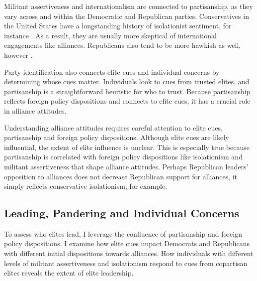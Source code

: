 \documentclass[12pt]{article}
\begin{document}
Militant assertiveness and internationalism are connected to partisanship, as they vary across and within the Democratic and Republican parties. 
Conservatives in the United States have a longstanding history of isolationist sentiment, for instance \citep{Kupchan2020}.
As a result, they are usually more skeptical of international engagements like alliances. 
Republicans also tend to be more hawkish as well, however \citep{Gries2014}. 


Party identification also connects elite cues and individual concerns by determining whose cues matter.
Individuals look to cues from trusted elites, and partisanship is a straightforward heuristic for who to trust. 
Because partisanship reflects foreign policy dispositions and connects to elite cues, it has a crucial role in alliance attitudes. 


Understanding alliance attitudes requires careful attention to elite cues, partisanship and foreign policy dispositions. 
Although elite cues are likely influential, the extent of elite influence is unclear. 
This is especially true because partisanship is correlated with foreign policy dispositions like isolationism and militant assertiveness that shape alliance attitudes. 
Perhaps Republican leaders' opposition to alliances does not decrease Republican support for alliances, it simply reflects conservative isolationism, for example. 





\subsection{Leading, Pandering and Individual Concerns}


To assess who elites lead, I leverage the confluence of partisanship and foreign policy dispositions.
I examine how elite cues impact Democrats and Republicans with different initial dispositions towards alliances.
How individuals with different levels of militant assertiveness and isolationism respond to cues from copartisan elites reveals the extent of elite leadership. 
\end{document}
